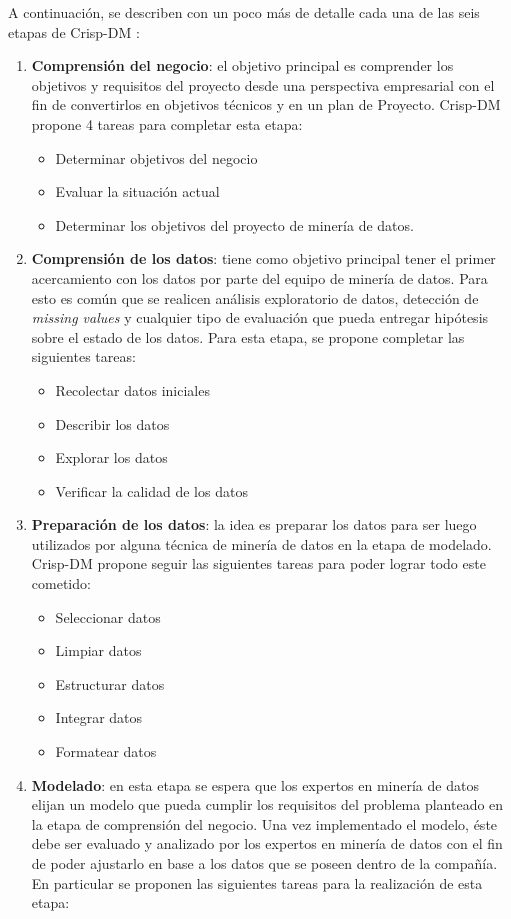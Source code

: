     A continuación, se describen con un poco más de detalle cada una de las seis etapas de Crisp-DM \cite{wirth2000crisp}:
\begin{enumerate}
    \item \textbf{Comprensión del negocio}: el objetivo principal es comprender los objetivos y requisitos del proyecto desde una perspectiva empresarial con el fin de convertirlos en objetivos técnicos y en un plan de Proyecto. Crisp-DM propone 4 tareas para completar esta etapa:
    \begin{itemize}
        \item Determinar objetivos del negocio
        \item Evaluar la situación actual
        \item Determinar los objetivos del proyecto de minería de datos.
    \end{itemize}
    \item \textbf{Comprensión de los datos}: tiene como objetivo principal tener el primer acercamiento con los datos por parte del equipo de minería de datos. Para esto es común que se realicen análisis exploratorio de datos, detección de \textit{missing values} y cualquier tipo de evaluación que pueda entregar hipótesis sobre el estado de los datos. Para esta etapa, se propone completar las siguientes tareas:
    \begin{itemize}
        \item Recolectar datos iniciales
        \item Describir los datos
        \item Explorar los datos
        \item Verificar la calidad de los datos
    \end{itemize}
    \item \textbf{Preparación de los datos}: la idea es preparar los datos para ser luego utilizados por alguna técnica de minería de datos en la etapa de modelado.  Crisp-DM propone seguir las siguientes tareas para poder lograr todo este cometido:
    \begin{itemize}
        \item Seleccionar datos
        \item Limpiar datos
        \item Estructurar datos
        \item Integrar datos
        \item Formatear datos
    \end{itemize}
    \item \textbf{Modelado}: en esta etapa se espera que los expertos en minería de datos elijan un modelo que pueda cumplir los requisitos del problema planteado en la etapa de comprensión del negocio. Una vez implementado el modelo, éste debe ser evaluado y analizado por los expertos  en minería de datos con el fin de poder ajustarlo en base a los datos que se poseen dentro de la compañía. En particular se proponen las siguientes tareas para la realización de esta etapa:

\end{enumerate}

